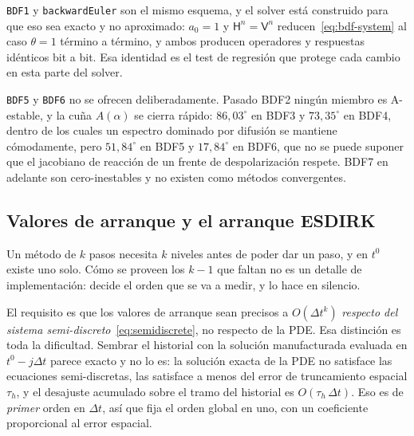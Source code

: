 \documentclass[11pt,a4paper]{article}
\newcommand{\code}[1]{\texttt{\small #1}}
\begin{document}
\code{BDF1} y \code{backwardEuler} son el mismo esquema, y el solver está construido para
que eso sea exacto y no aproximado: $a_0=1$ y $\mathsf{H}^n=\mathsf{V}^n$
reducen~\eqref{eq:bdf-system} al caso $\theta=1$ término a término, y ambos producen
operadores y respuestas idénticos bit a bit. Esa identidad es el test de regresión que
protege cada cambio en esta parte del solver.

\code{BDF5} y \code{BDF6} no se ofrecen deliberadamente. Pasado BDF2 ningún miembro es
A-estable, y la cuña $A(\alpha)$ se cierra rápido: $86{,}03^\circ$ en BDF3 y $73{,}35^\circ$
en BDF4, dentro de los cuales un espectro dominado por difusión se mantiene cómodamente,
pero $51{,}84^\circ$ en BDF5 y $17{,}84^\circ$ en BDF6, que no se puede suponer que el
jacobiano de reacción de un frente de despolarización respete. BDF7 en adelante son
cero-inestables y no existen como métodos convergentes.

\subsection{Valores de arranque y el arranque ESDIRK}
\label{sec:bdf-startup}

Un método de $k$ pasos necesita $k$ niveles antes de poder dar un paso, y en $t^0$ existe
uno solo. Cómo se proveen los $k-1$ que faltan no es un detalle de implementación: decide el
orden que se va a medir, y lo hace en silencio.

El requisito es que los valores de arranque sean precisos a $O(\Delta t^k)$ \emph{respecto
del sistema semi-discreto}~\eqref{eq:semidiscrete}, no respecto de la PDE. Esa distinción es
toda la dificultad. Sembrar el historial con la solución manufacturada evaluada en
$t^0-j\Delta t$ parece exacto y no lo es: la solución exacta de la PDE no satisface las
ecuaciones semi-discretas, las satisface a menos del error de truncamiento espacial
$\tau_h$, y el desajuste acumulado sobre el tramo del historial es $O(\tau_h\,\Delta t)$.
Eso es de \emph{primer} orden en $\Delta t$, así que fija el orden global en uno, con un
coeficiente proporcional al error espacial.
\end{document}
